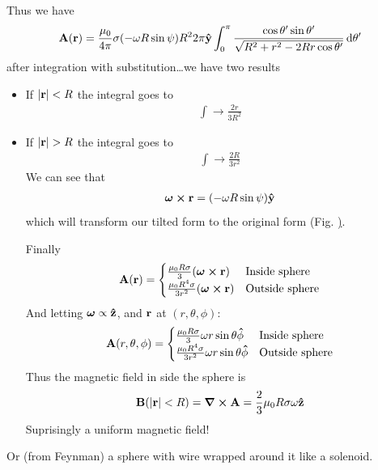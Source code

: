 \documentclass[../main.tex]{subfiles}
\begin{document}
Thus we have 
\begin{align*}
    \vb A (\vb r) = \frac{\mu_0}{4\pi} \sigma (-\omega R \sin\psi) R^2 2\pi \vu y
    \int_0^\pi \frac{\cos\theta'\sin\theta'}{\sqrt{R^2 + r^2 - 2Rr\cos\theta'}} \dd{\theta'}
\end{align*}
after integration with substitution\dots we have two results
\begin{itemize}
    \item If $\abs{\vb r} < R$ the integral goes to
    \begin{align*}
        \int \to \frac{2r}{3R^2}
    \end{align*}
    \item If $\abs{\vb r} > R$ the integral goes to
    \begin{align*}
        \int \to \frac{2R}{3r^2}
    \end{align*}
    We can see that
    \begin{align*}
        \vb*\omega \cross \vb r = (-\omega R \sin\psi) \vu y
    \end{align*}
    which will transform our tilted form to the original form (Fig. \href{fig:fig5_48}).

    Finally
    \begin{align*}
        \vb A (\vb r) = \begin{cases}
            \frac{\mu_0 R \sigma}{3} (\vb*\omega \cross \vb r) & \text{Inside sphere} \\
            \frac{\mu_0 R^4 \sigma}{3r^2} (\vb*\omega \cross \vb r) & \text{Outside sphere}
        \end{cases}
    \end{align*}
    And letting $\vb*\omega \propto \vu z$, and $\vb r$ at $(r, \theta, \phi)$:
    \begin{align*}
        \vb A (r, \theta, \phi) = \begin{cases}
            \frac{\mu_0 R \sigma}{3} \omega r \sin\theta \vu \phi & \text{Inside sphere} \\
            \frac{\mu_0 R^4 \sigma}{3r^2} \omega r \sin\theta \vu \phi & \text{Outside sphere}
        \end{cases}
    \end{align*}
    Thus the magnetic field in side the sphere is
    \begin{align*}
        \vb B(\abs{\vb r} < R) = \curl \vb A = \frac{2}{3} \mu_0 R \sigma \omega \vu{z}
    \end{align*}
    Suprisingly a uniform magnetic field!
\end{itemize}
Or (from Feynman) a sphere with wire wrapped around it like a solenoid.
\end{document}
